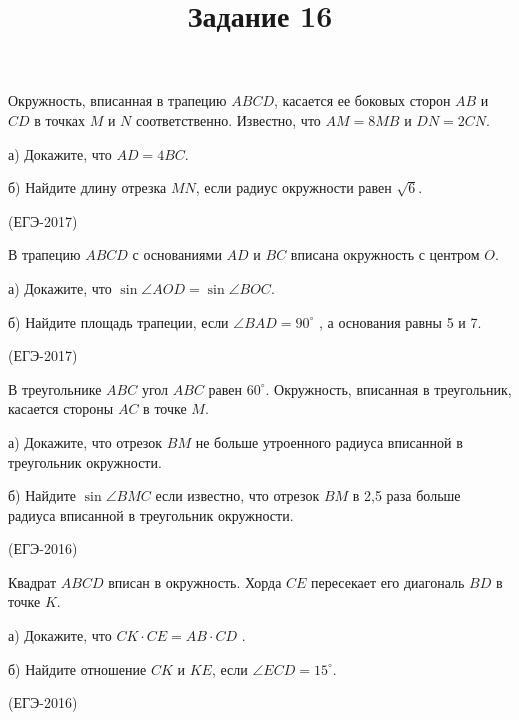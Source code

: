 \documentclass[c,12pt]{beamer}  %
\begin{document}
\title{Задание 16}
\frame[plain]{\titlepage}	%

	\begin{frame}
		\begin{block}{}
			Окружность, вписанная в трапецию $ABCD$, касается ее боковых
			сторон $AB$ и $CD$ в точках $M$ и $N$ соответственно. Известно, что
		 $AM = 8MB$ и $DN = 2CN$.
			
			а) Докажите, что $AD = 4BC$.
			
			б) Найдите длину отрезка $MN$, если радиус окружности
			равен $\sqrt6$.
			
			(ЕГЭ-2017)
		\end{block}
	\end{frame}

	\begin{frame}
		\begin{block}{}
			В трапецию $ABCD$ с основаниями $AD$ и $BC$ вписана окружность
			с центром $O$.
			
			а) Докажите, что $ \sin \angle AOD = \sin \angle BOC$.
			
			б) Найдите площадь трапеции, если $\angle BAD = 90^{\circ}$  , а основания
			равны 5 и 7.
			
			(ЕГЭ-2017)
		\end{block}
	\end{frame}

	\begin{frame}
		\begin{block}{}
			В треугольнике $ABC$ угол $ABC$ равен $60^\circ$. Окружность,
			вписанная в треугольник, касается стороны $AC$ в точке $M$.
			
			а) Докажите, что отрезок $BM$ не больше утроенного радиуса
			вписанной в треугольник окружности.
			
			б) Найдите $ \sin  \angle BMC$ если известно, что отрезок $BM$ в 2,5 раза
			больше радиуса вписанной в треугольник окружности.
			
			(ЕГЭ-2016)
		\end{block}
	\end{frame}

	\begin{frame}
		\begin{block}{}
			Квадрат $ABCD$ вписан в окружность. Хорда $CE$ пересекает его
			диагональ $BD$ в точке $K$.
			
			а) Докажите, что  $CK \cdot CE = AB \cdot CD$ .
			
			б) Найдите отношение $CK$ и $KE$, если $ \angle ECD = 15^\circ$.
			
			(ЕГЭ-2016)
		\end{block}
	\end{frame}
\end{document}

